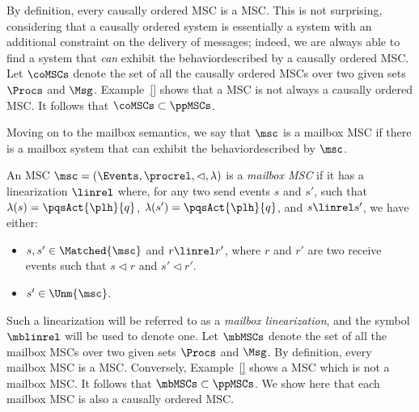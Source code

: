 By definition, every causally ordered MSC is a \pp MSC. This is not surprising, considering that a causally ordered system is essentially a \pp system with an additional constraint on the delivery of messages; indeed, we are always able to find a \pp system that \emph{can} exhibit the behaviordescribed by a causally ordered MSC. Let $\coMSCs$ denote the set of all the causally ordered MSCs over two given sets $\Procs$ and $\Msg$. Example~\ref{} shows that a \pp MSC is not always a causally ordered MSC. It follows that $\coMSCs \subset \ppMSCs$.

\medskip

Moving on to the mailbox semantics, we say that $\msc$ is a mailbox MSC if there is a mailbox system that can exhibit the behaviordescribed by $\msc$.

\begin{definition}%
An MSC $\msc = (\Events,\procrel,\lhd,\lambda)$ is a \emph{mailbox MSC} if it has a linearization $\linrel$ where, for any two send events $s$ and $s'$, such that $\lambda(s)=\pqsAct{\plh}{q}$, $\lambda(s')=\pqsAct{\plh}{q}$, and $s \linrel s'$, we have either:
\begin{itemize}\itemsep=0.5ex
	\item $s,s' \in \Matched{\msc}$ and $r \linrel r'$, where $r$ and $r'$ are two receive events such that $s \lhd r$ and $s' \lhd r'$.
	\item $s' \in \Unm{\msc}$.
\end{itemize}
\end{definition}

Such a linearization will be referred to as a \emph{mailbox linearization}, and the symbol $\mblinrel$ will be used to denote one. Let $\mbMSCs$ denote the set of all the mailbox MSCs over two given sets $\Procs$ and $\Msg$. By definition, every mailbox MSC is a \pp MSC. Conversely, Example~\ref{} shows a \pp MSC which is not a mailbox MSC. It follows that $\mbMSCs \subset \ppMSCs$. We show here that each mailbox MSC is also a causally ordered MSC.

